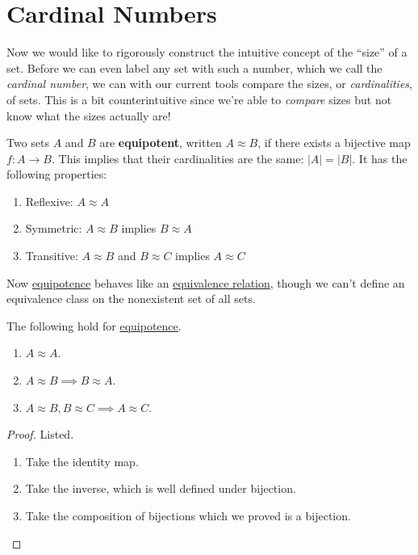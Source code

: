 \section{Cardinal Numbers} 

  Now we would like to rigorously construct the intuitive concept of the ``size'' of a set. Before we can even label any set with such a number, which we call the \textit{cardinal number}, we can with our current tools compare the sizes, or \textit{cardinalities}, of sets. This is a bit counterintuitive since we're able to \textit{compare} sizes but not know what the sizes actually are! 

  \begin{definition}[Equipotence]
    \label{def:equipotence}
    Two sets $A$ and $B$ are \textbf{equipotent}, written $A \approx B$, if there exists a bijective map $f: A \rightarrow B$. This implies that their cardinalities are the same: $|A| = |B|$. It has the following properties: 
    \begin{enumerate}
      \item Reflexive: $A \approx A$
      \item Symmetric: $A \approx B$ implies $B \approx A$
      \item Transitive: $A \approx B$ and $B \approx C$ implies $A \approx C$
    \end{enumerate}
  \end{definition} 

  Now \hyperref[def:equipotence]{equipotence} behaves like an \hyperref[def:equivalence_relation]{equivalence relation}, though we can't define an equivalence class on the nonexistent set of all sets. 

  \begin{theorem}
    \label{thm:equipotence-is-an-equivalence-relation}
    The following hold for \hyperref[def:equipotence]{equipotence}. 
    \begin{enumerate}
      \item $A \approx A$. 
      \item $A \approx B \implies B \approx A$. 
      \item $A \approx B, B \approx C \implies A \approx C$. 
    \end{enumerate}
  \end{theorem}
  \begin{proof}
    Listed. 
    \begin{enumerate}
      \item Take the identity map. 
      \item Take the inverse, which is well defined under bijection. 
      \item Take the composition of bijections which we proved is a bijection. 
    \end{enumerate}
  \end{proof}

